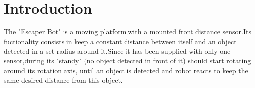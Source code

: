 \section{Introduction}
The "Escaper Bot" is a moving platform,with a mounted front distance sensor.Its fuctionality consists in keep a constant distance between itself and an object detected in a set radius around it.Since it has been supplied with only one sensor,during its "standy" (no object detected in front of it) should start rotating around its rotation axis, until an object is detected and robot reacts to keep the same desired distance from this object.
